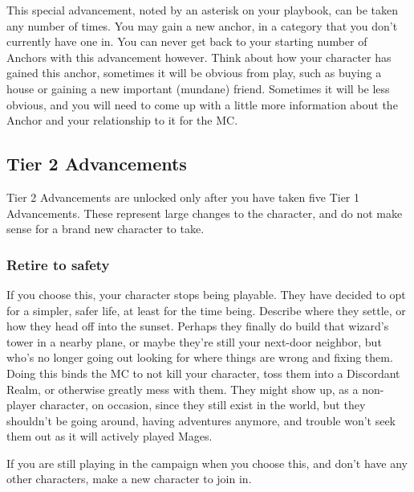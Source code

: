 \documentclass[
  oneside,
  statementpaper,
  9pt]{memoir}
\begin{document}
\begin{Player}

This special advancement, noted by an asterisk on your playbook, can be taken any number of times. You may gain a new anchor, in a category that you don’t currently have one in. You can never get back to your starting number of Anchors with this advancement however. Think about how your character has gained this anchor, sometimes it will be obvious from play, such as buying a house or gaining a new important (mundane) friend. Sometimes it will be less obvious, and you will need to come up with a little more information about the Anchor and your relationship to it for the MC. 

\end{Player}

\hypertarget{tier-2-advancements}{%
\subsection{Tier 2 Advancements}\label{tier-2-advancements}}

\begin{Player}

Tier 2 Advancements are unlocked only after you have taken five Tier 1 Advancements. These represent large changes to the character, and do not make sense for a brand new character to take. 

\end{Player}

\hypertarget{retire-to-safety}{%
\subsubsection{Retire to safety}\label{retire-to-safety}}

\begin{Player}

If you choose this, your character stops being playable. They have decided to opt for a simpler, safer life, at least for the time being. Describe where they settle, or how they head off into the sunset. Perhaps they finally do build that wizard's tower in a nearby plane, or maybe they're still your next-door neighbor, but who's no longer going out looking for where things are wrong and fixing them. Doing this binds the MC to not kill your character, toss them into a Discordant Realm, or otherwise greatly mess with them. They might show up, as a non-player character, on occasion, since they still exist in the world, but they shouldn’t be going around, having adventures anymore, and trouble won’t seek them out as it will actively played Mages.

If you are still playing in the campaign when you choose this, and don’t have any other characters, make a new character to join in.

\end{Player}
\end{document}
